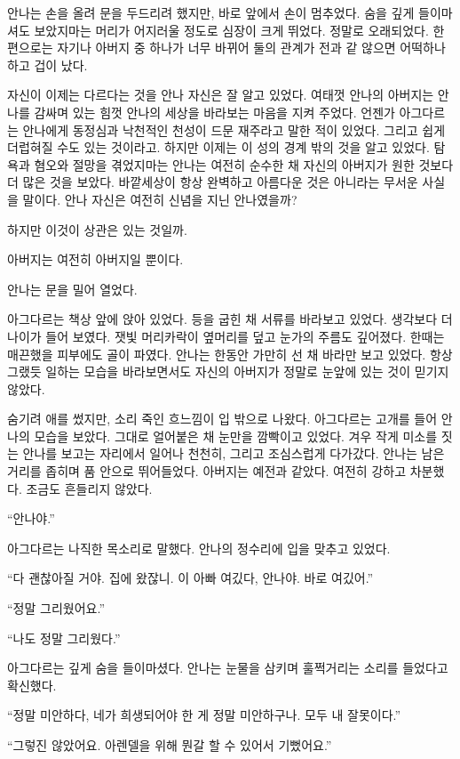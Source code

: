 안나는 손을 올려 문을 두드리려 했지만, 바로 앞에서 손이 멈추었다. 숨을 깊게 들이마셔도 보았지마는 머리가 어지러울 정도로 심장이 크게 뛰었다. 정말로 오래되었다. 한편으로는 자기나 아버지 중 하나가 너무 바뀌어 둘의 관계가 전과 같 않으면 어떡하나 하고 겁이 났다.

자신이 이제는 다르다는 것을 안나 자신은 잘 알고 있었다. 여태껏 안나의 아버지는 안나를 감싸며 있는 힘껏 안나의 세상을 바라보는 마음을 지켜 주었다. 언젠가 아그다르는 안나에게 동정심과 낙천적인 천성이 드문 재주라고 말한 적이 있었다. 그리고 쉽게 더럽혀질 수도 있는 것이라고. 하지만 이제는 이 성의 경계 밖의 것을 알고 있었다. 탐욕과 혐오와 절망을 겪었지마는 안나는 여전히 순수한 채 자신의 아버지가 원한 것보다 더 많은 것을 보았다. 바깥세상이 항상 완벽하고 아름다운 것은 아니라는 무서운 사실을 말이다. 안나 자신은 여전히 신념을 지닌 안나였을까?

하지만 이것이 상관은 있는 것일까.

아버지는 여전히 아버지일 뿐이다.

안나는 문을 밀어 열었다.

아그다르는 책상 앞에 앉아 있었다. 등을 굽힌 채 서류를 바라보고 있었다. 생각보다 더 나이가 들어 보였다. 잿빛 머리카락이 옆머리를 덮고 눈가의 주름도 깊어졌다. 한때는 매끈했을 피부에도 골이 파였다. 안나는 한동안 가만히 선 채 바라만 보고 있었다. 항상 그랬듯 일하는 모습을 바라보면서도 자신의 아버지가 정말로 눈앞에 있는 것이 믿기지 않았다.

숨기려 애를 썼지만, 소리 죽인 흐느낌이 입 밖으로 나왔다. 아그다르는 고개를 들어 안나의 모습을 보았다. 그대로 얼어붙은 채 눈만을 깜빡이고 있었다. 겨우 작게 미소를 짓는 안나를 보고는 자리에서 일어나 천천히, 그리고 조심스럽게 다가갔다. 안나는 남은 거리를 좁히며 품 안으로 뛰어들었다. 아버지는 예전과 같았다. 여전히 강하고 차분했다. 조금도 흔들리지 않았다.

``안나야.''

아그다르는 나직한 목소리로 말했다. 안나의 정수리에 입을 맞추고 있었다.

``다 괜찮아질 거야. 집에 왔잖니. 이 아빠 여깄다, 안나야. 바로 여깄어.''

``정말 그리웠어요.''

``나도 정말 그리웠다.''

아그다르는 깊게 숨을 들이마셨다. 안나는 눈물을 삼키며 훌쩍거리는 소리를 들었다고 확신했다.

``정말 미안하다, 네가 희생되어야 한 게 정말 미안하구나. 모두 내 잘못이다.''

``그렇진 않았어요. 아렌델을 위해 뭔갈 할 수 있어서 기뻤어요.''

